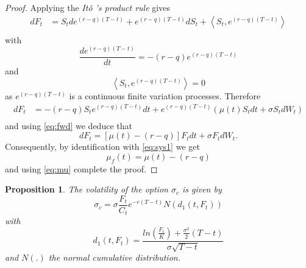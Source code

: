 \documentclass{article}
\newtheorem{prop}[thm]{Proposition}
\theoremstyle{definition}
\theoremstyle{remark}
\newcommand{\Ito}{It\^{o} }
\newcommand{\done}{\ensuremath{\frac{ln\left( \frac{F_t}{K}\right)+\frac{\sigma^2}{2}(T-t)}{\sigma\sqrt{T-t}}}}
\begin{document}
\begin{proof}
Applying the \emph{\Ito's product rule} gives 
\begin{align*}
dF_t &= S_tde^{(r-q)(T-t)}+e^{(r-q)(T-t)}dS_t+\left<S_t,e^{(r-q)(T-t)}\right>\\
\end{align*}
with 
\begin{equation*}
\frac{de^{(r-q)(T-t)}}{dt}=-(r-q)e^{(r-q)(T-t)}
\end{equation*}
and 
\begin{equation*}
\left<S_t,e^{(r-q)(T-t)}\right>=0
\end{equation*}
as $e^{(r-q)(T-t)}$ is a continuous finite variation processes. Therefore
\begin{align*}
dF_t &= -(r-q)S_te^{(r-q)(T-t)}dt+e^{(r-q)(T-t)}(\mu(t)S_tdt+\sigma S_tdW_t)\\
\end{align*}
and using \eqref{eq:fwd} we deduce that 
\begin{equation*}
dF_t = \left[ \mu(t)-(r-q) \right]F_tdt+\sigma F_tdW_t.
\end{equation*}
Consequently, by identification with \eqref{eq:sys1} we get
\begin{equation*}
\mu_f(t)=\mu(t)-(r-q)
\end{equation*}
and using \eqref{eq:mu} complete the proof.
\end{proof}




\begin{prop}\label{prop:riskn3}
The volatility of the option $\sigma_c$ is given by
\begin{equation}\label{eq:sigma_c}
	\sigma_c = \sigma \frac{F_t}{C_t}e^{-r(T-t)}N(d_1(t,F_t))
\end{equation}
with 
\begin{equation}
d_1(t,F_t)=\done
\end{equation}
and $N(.)$ the normal cumulative distribution.
\end{prop}
\end{document}
